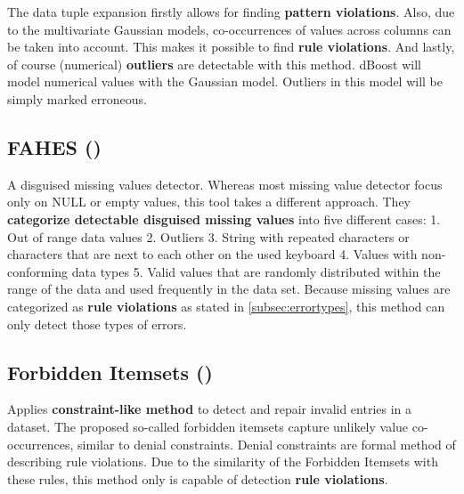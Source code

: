 The data tuple expansion firstly allows for finding \textbf{pattern violations}. 
Also, due to the multivariate Gaussian models, co-occurrences of values across columns can be taken into account. This makes it possible to find \textbf{rule violations}.
And lastly, of course (numerical) \textbf{outliers} are detectable with this method. dBoost will model numerical values with the Gaussian model. Outliers in this model will be simply marked erroneous. 

\subsection{FAHES (\cite{Qahtan2018-te})}
A disguised missing values detector. Whereas most missing value detector focus only on NULL or empty values, this tool takes a different approach. They \textbf{categorize detectable disguised missing values} into five different cases: 1. Out of range data values 2. Outliers 3. String with repeated characters or characters that are next to each other on the used keyboard 4. Values with non-conforming data types 5. Valid values that are randomly distributed within the range of the data and used frequently in the data set. 
Because missing values are categorized as \textbf{rule violations} as stated in \autoref{subsec:errortypes}, this method can only detect those types of errors. 

\subsection{Forbidden Itemsets (\cite{Rammelaere2019-ea})}
Applies \textbf{constraint-like method} to detect and repair invalid entries in a dataset. The proposed so-called forbidden itemsets capture unlikely value co-occurrences, similar to denial constraints. Denial constraints are formal method of describing rule violations. Due to the similarity of the Forbidden Itemsets with these rules, this method only is capable of detection \textbf{rule violations}.



